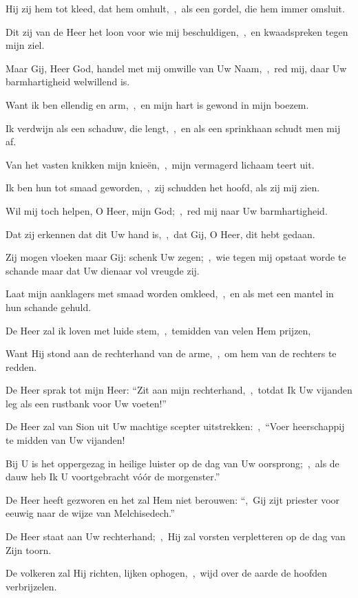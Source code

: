 \documentclass[12pt,twoside,a5paper]{article}
\begin{document}
\begin{halfparskip}
  Hij zij hem tot kleed, dat hem omhult,~\sep\ als een gordel, die hem immer omsluit.

  Dit zij van de Heer het loon voor wie mij beschuldigen,~\sep\ en kwaadspreken tegen mijn ziel.

  Maar Gij, Heer God, handel met mij omwille van Uw Naam,~\sep\ red mij, daar Uw barmhartigheid welwillend is.

  Want ik ben ellendig en arm,~\sep\ en mijn hart is gewond in mijn boezem.

  Ik verdwijn als een schaduw, die lengt,~\sep\ en als een sprinkhaan schudt men mij af.

  Van het vasten knikken mijn knieën,~\sep\ mijn vermagerd lichaam teert uit.

  Ik ben hun tot smaad geworden,~\sep\ zij schudden het hoofd, als zij mij zien.

  Wil mij toch helpen, O Heer, mijn God;~\sep\ red mij naar Uw barmhartigheid.

  Dat zij erkennen dat dit Uw hand is,~\sep\ dat Gij, O Heer, dit hebt gedaan.

  Zij mogen vloeken maar Gij: schenk Uw zegen;~\sep\ wie tegen mij opstaat worde te schande maar dat Uw dienaar vol vreugde zij.

  Laat mijn aanklagers met smaad worden omkleed,~\sep\ en als met een mantel in hun schande gehuld.

  De Heer zal ik loven met luide stem,~\sep\ temidden van velen Hem prijzen,

  Want Hij stond aan de rechterhand van de arme,~\sep\ om hem van de rechters te redden.

   De Heer sprak tot mijn Heer: ``Zit aan mijn rechterhand,~\sep\ totdat Ik Uw vijanden leg als een rustbank voor Uw voeten!''

  De Heer zal van Sion uit Uw machtige scepter uitstrekken:~\sep\ ``Voer heerschappij te midden van Uw vijanden!

  Bij U is het oppergezag in heilige luister op de dag van Uw oorsprong;~\sep\ als de dauw heb Ik U voortgebracht vóór de morgenster.''

  De Heer heeft gezworen en het zal Hem niet berouwen: ``\sep\ Gij zijt priester voor eeuwig naar de wijze van Melchisedech.''

  De Heer staat aan Uw rechterhand;~\sep\ Hij zal vorsten verpletteren op de dag van Zijn toorn.

  De volkeren zal Hij richten, lijken ophogen,~\sep\ wijd over de aarde de hoofden verbrijzelen.


\end{halfparskip}
\end{document}
